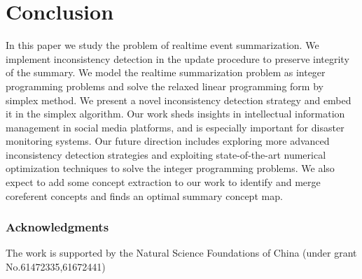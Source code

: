 \documentclass[runningheads]{llncs}
\begin{document}
\section{Conclusion}\label{sec:conclusion}
 In this paper we study the problem of realtime event summarization. We implement inconsistency detection in the update procedure to preserve integrity of the summary. We model the realtime summarization problem as integer programming problems and solve the relaxed linear programming form by simplex method. We present a novel inconsistency detection strategy and embed it in the simplex algorithm. Our work sheds insights in intellectual information management in social media platforms, and is especially important for disaster monitoring systems. Our future direction includes exploring more advanced inconsistency detection strategies and exploiting state-of-the-art numerical optimization techniques to solve the integer programming problems. We also expect to add some concept extraction to our work to identify and merge coreferent concepts and finds an optimal summary concept map.

 \subsubsection{Acknowledgments} The work is supported by the Natural Science Foundations of China (under grant No.61472335,61672441)
\end{document}

